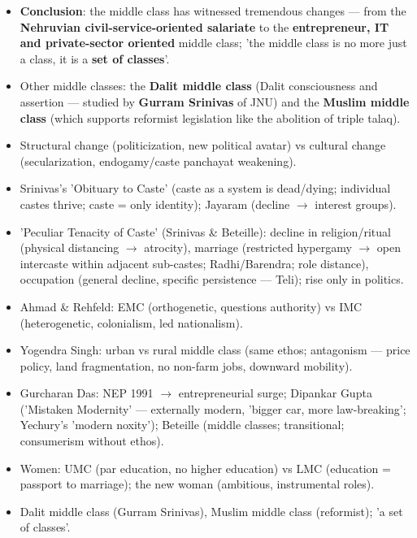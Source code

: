 \begin{KeyConcept}
\begin{itemize}
\item \textbf{Conclusion}: the middle class has witnessed tremendous changes --- from the \textbf{Nehruvian civil-service-oriented salariate} to the \textbf{entrepreneur, IT and private-sector oriented} middle class; 'the middle class is no more just a class, it is a \textbf{set of classes}'.
\item Other middle classes: the \textbf{Dalit middle class} (Dalit consciousness and assertion --- studied by \textbf{Gurram Srinivas} of JNU) and the \textbf{Muslim middle class} (which supports reformist legislation like the abolition of triple talaq).
\end{itemize}
\end{KeyConcept}

\begin{QuickRevision}
\begin{itemize}
\item Structural change (politicization, new political avatar) vs cultural change (secularization, endogamy/caste panchayat weakening).
\item Srinivas's 'Obituary to Caste' (caste as a system is dead/dying; individual castes thrive; caste = only identity); Jayaram (decline $\rightarrow$ interest groups).
\item 'Peculiar Tenacity of Caste' (Srinivas \& Beteille): decline in religion/ritual (physical distancing $\rightarrow$ atrocity), marriage (restricted hypergamy $\rightarrow$ open intercaste within adjacent sub-castes; Radhi/Barendra; role distance), occupation (general decline, specific persistence --- Teli); rise only in politics.
\item Ahmad \& Rehfeld: EMC (orthogenetic, questions authority) vs IMC (heterogenetic, colonialism, led nationalism).
\item Yogendra Singh: urban vs rural middle class (same ethos; antagonism --- price policy, land fragmentation, no non-farm jobs, downward mobility).
\item Gurcharan Das: NEP 1991 $\rightarrow$ entrepreneurial surge; Dipankar Gupta ('Mistaken Modernity' --- externally modern, 'bigger car, more law-breaking'; Yechury's 'modern noxity'); Beteille (middle classes; transitional; consumerism without ethos).
\item Women: UMC (par education, no higher education) vs LMC (education = passport to marriage); the new woman (ambitious, instrumental roles).
\item Dalit middle class (Gurram Srinivas), Muslim middle class (reformist); 'a set of classes'.
\end{itemize}
\end{QuickRevision}

